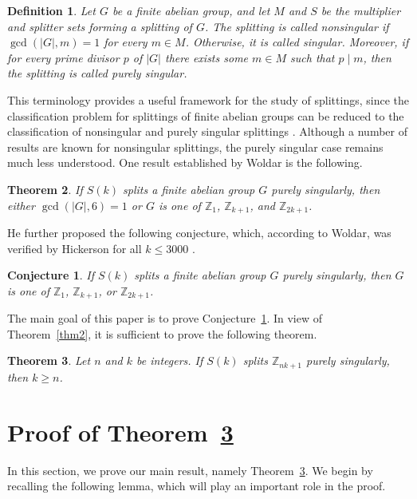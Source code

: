 \documentclass[12pt]{article}
\newtheorem{theorem}{Theorem}[section]
\newtheorem{definition}[theorem]{Definition}
\newtheorem{conjecture}[problem]{Conjecture}
\begin{document}
\begin{definition}
Let $G$ be a finite abelian group, and let $M$ and $S$ be the multiplier and splitter sets forming a splitting of $G$. The splitting is called \emph{nonsingular} if $\gcd(|G|,m)=1$ for every $m\in M$. Otherwise, it is called \emph{singular}. Moreover, if for every prime divisor $p$ of $|G|$ there exists some $m\in M$ such that $p\mid m$, then the splitting is called \emph{purely singular}.
\end{definition}

This terminology provides a useful framework for the study of splittings, since the classification problem for splittings of finite abelian groups can be reduced to the classification of nonsingular and purely singular splittings \cite{SS1994}. Although a number of results are known for nonsingular splittings, the purely singular case remains much less understood. One result established by Woldar \cite{W1995} is the following.

\begin{theorem}\label{lem-1}\cite{W1995}
If $S(k)$ splits a finite abelian group $G$ purely singularly, then either $\gcd(|G|,6)=1$ or $G$ is one of $\mathbb{Z}_1$, $\mathbb{Z}_{k+1}$, and $\mathbb{Z}_{2k+1}$.
\end{theorem}

He further proposed the following conjecture, which, according to Woldar, was verified by Hickerson for all $k\le 3000$ \cite{W1995}.

\begin{conjecture}\cite{W1995}\label{conj1}
If $S(k)$ splits a finite abelian group $G$ purely singularly, then $G$ is one of $\mathbb{Z}_1$, $\mathbb{Z}_{k+1}$, or $\mathbb{Z}_{2k+1}$.
\end{conjecture}


The main goal of this paper is to prove Conjecture~\ref{conj1}. In view of Theorem~\ref{thm2}, it is sufficient to prove the following theorem.

\begin{theorem}\label{mainthm}
Let $n$ and $k$ be integers. If $S(k)$ splits $\mathbb{Z}_{nk+1}$ purely singularly, then $k\ge n$.
\end{theorem}

\section{Proof of Theorem~\ref{mainthm}}
In this section, we prove our main result, namely Theorem~\ref{mainthm}. We begin by recalling the following lemma, which will play an important role in the proof.
\end{document}
